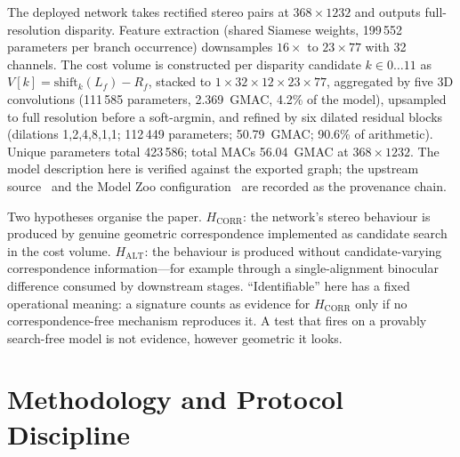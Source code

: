 \documentclass[conference]{IEEEtran}
\begin{document}
The deployed network takes rectified stereo pairs at $368\times1232$ and outputs full-resolution disparity. Feature extraction (shared Siamese weights, 199\,552 parameters per branch occurrence) downsamples $16\times$ to $23\times77$ with 32 channels. The cost volume is constructed per disparity candidate $k \in 0\ldots11$ as $V[k] = \mathrm{shift}_k(L_f) - R_f$, stacked to $1\times32\times12\times23\times77$, aggregated by five 3D convolutions (111\,585 parameters, 2.369~GMAC, 4.2\% of the model), upsampled to full resolution before a soft-argmin, and refined by six dilated residual blocks (dilations 1,2,4,8,1,1; 112\,449 parameters; 50.79~GMAC; 90.6\% of arithmetic). Unique parameters total 423\,586; total MACs 56.04~GMAC at $368\times1232$. The model description here is verified against the exported graph; the upstream source~\cite{nivosco_stereonet} and the Model Zoo configuration~\cite{hailo2023stereonet} are recorded as the provenance chain.

Two hypotheses organise the paper. $H_{\mathrm{CORR}}$: the network's stereo behaviour is produced by genuine geometric correspondence implemented as candidate search in the cost volume. $H_{\mathrm{ALT}}$: the behaviour is produced without candidate-varying correspondence information---for example through a single-alignment binocular difference consumed by downstream stages. ``Identifiable'' here has a fixed operational meaning: a signature counts as evidence for $H_{\mathrm{CORR}}$ only if no correspondence-free mechanism reproduces it. A test that fires on a provably search-free model is not evidence, however geometric it looks.

\section{Methodology and Protocol Discipline}
\label{sec:methods}
\end{document}
